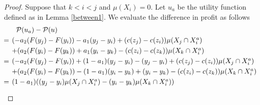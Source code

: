 \documentclass[12pt,reqno]{amsart}
\begin{document}
 \begin{proof}
Suppose that   $k<i<j$ and $\mu(X_i)=0.$ Let $u_a$ be the utility function defined as in Lemma \ref{between1}. We evaluate the difference in profit as follows
\[\hspace{-6pt}\begin{array}{ll} &\mathcal{P}(u_a)-\mathcal{P}(u) \vspace{3pt}\\
      =&\hspace{-6pt} (-a_2(F(y_j)-F(y_i))-a_1(y_j-y_i)+(c(z_j)-c(z_i))\mu( X_j\cap X_i^a)\vspace{3pt}\\
      &\hspace{-6pt} +(a_2(F(y_i)-F(y_k))+a_1(y_i-y_k)
      -(c(z_i)-c(z_k))\mu( X_k\cap X_i^a)\vspace{3pt}\\
  =&\hspace{-6pt}(-a_2(F(y_j)-F(y_i))+(1-a_1)(y_j-y_i)-(y_j-y_i)+(c(z_j)-c(z_i))\mu( X_j\cap X_i^a)\vspace{3pt}\\
      &\hspace{-6pt}+(a_2(F(y_i)-F(y_k))-(1-a_1)(y_i-y_k)+(y_i-y_k)-(c(z_i)-c(z_k))\mu( X_k\cap X_i^a)\vspace{3pt}\\
      =&\hspace{-6pt}(1-a_1)((y_j-y_i)\mu( X_j\cap X_i^a)-(y_i-y_k)\mu( X_k\cap X_i^a))\vspace{3pt}\\
      

\end{array}\]
\end{proof}
\end{document}
